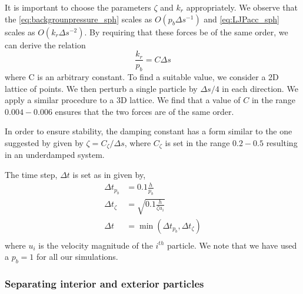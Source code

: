 \documentclass[preprint,12pt]{elsarticle}
\begin{document}
It is important to choose the parameters $\zeta$ and $k_r$ appropriately. We
observe that the \cref{eq:backgrounpressure_sph} scales as $O(p_b \Delta
s^{-1})$ and \cref{eq:LJPacc_sph} scales as $O(k_r \Delta s^{-2})$. By
requiring that these forces be of the same order, we can derive the relation
\begin{equation}
  \frac{k_r}{p_b} = C \Delta s
\end{equation}
where C is an arbitrary constant. To find a suitable value, we consider a 2D
lattice of points. We then perturb a single particle by $\Delta s/4$ in each
direction. We apply a similar procedure to a 3D lattice. We find that a value
of $C$ in the range $0.004 - 0.006$ ensures that the two forces are of the
same order.

In order to ensure stability, the damping constant has a form similar to the
one suggested by \citet{colagrossi2012particle} given by $\zeta =
C_{\zeta}/\Delta s$, where $C_{\zeta}$ is set in the range $0.2-0.5$
resulting in an underdamped system.

The time step, $\Delta t$ is set as in \citet{Adami2013} given by,
\begin{equation}
  \begin{split}
    \Delta t_{p_b} &= 0.1 \frac{h}{p_b} \\
    \Delta t_{\zeta} &= \sqrt{0.1 \frac{h}{\zeta u_{i}}} \\
    \Delta t &= \min(\Delta t_{p_b}, \Delta t_{\zeta})\\
  \end{split}
\end{equation}
where $u_i$ is the velocity magnitude of the $i^{th}$ particle. We note that
we have used a $p_b=1$ for all our simulations.

\subsubsection{Separating interior and exterior particles}
\label{subsec:inter}
\end{document}
